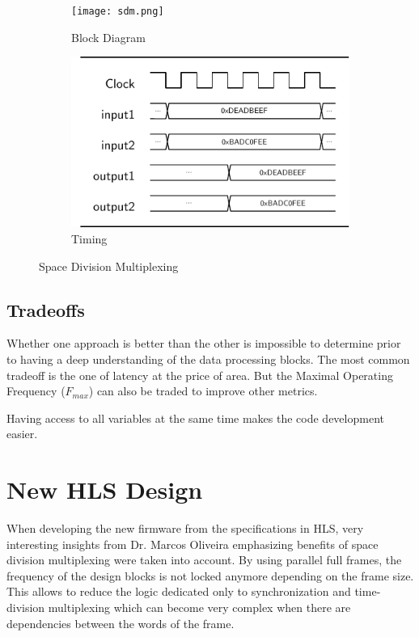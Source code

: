 \begin{figure}
    \begin{subfigure}{.5\textwidth}
        \centering
        \texttt{[image: sdm.png]}
        \caption{Block Diagram}
    \end{subfigure}
    \begin{subfigure}{.5\textwidth}
        \centering
        \includegraphics[width=1\linewidth]{../timings/sdm.pdf}
        \caption{Timing}
    \end{subfigure}
    \caption{Space Division Multiplexing}
    \label{fig:space-division-multiplexing}
\end{figure}

\subsection{Tradeoffs}\label{sec:space-versus-time-division-multiplexing}
Whether one approach is better than the other is impossible to determine prior to having a deep understanding of the data processing blocks.
The most common tradeoff is the one of latency at the price of area. But the Maximal Operating Frequency (\(F_{max}\)) can also be traded to 
improve other metrics.

Having access to all variables at the same time makes the code development easier.

\section{New HLS Design}\label{sec:current-hls-design}
When developing the new firmware from the specifications in HLS, very interesting insights from Dr. Marcos Oliveira emphasizing benefits of space division multiplexing were taken into account. By using parallel full frames, the frequency of the design blocks is not locked anymore depending on the frame size. This allows to reduce the logic dedicated only to synchronization and time-division multiplexing which can become very complex when there are dependencies between the words of the frame.

